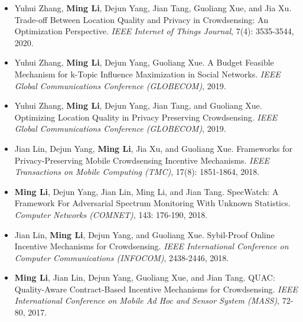  

\begin{itemize}[leftmargin=*]
	\item
	Yuhui Zhang, \textbf{Ming Li}, Dejun Yang, Jian Tang, Guoliang Xue, and Jia Xu. Trade-off Between Location Quality and Privacy in Crowdsensing: An Optimization Perspective. \textit{IEEE Internet of Things Journal}, 7(4): 3535-3544, 2020.
	
	\item
	Yuhui Zhang, \textbf{Ming Li}, Dejun Yang, Guoliang Xue.
	A Budget Feasible Mechanism for k-Topic Influence Maximization in Social Networks.
	\textit{IEEE Global Communications Conference (GLOBECOM)}, 2019.
	
	\item
	Yuhui Zhang, \textbf{Ming Li}, Dejun Yang, Jian Tang, and Guoliang Xue.
	Optimizing Location Quality in Privacy Preserving Crowdsensing.
	\textit{IEEE Global Communications Conference (GLOBECOM)}, 2019.
	
	\item 
	Jian Lin, Dejun Yang, \textbf{Ming Li}, Jia Xu, and Guoliang Xue. Frameworks for Privacy-Preserving Mobile Crowdsensing Incentive Mechanisms. \textit{IEEE Transactions on Mobile Computing (TMC)}, 17(8): 1851-1864, 2018.
	
	\item 
	\textbf{Ming Li}, Dejun Yang, Jian Lin, Ming Li, and Jian Tang. SpecWatch: A Framework For Adversarial Spectrum Monitoring With Unknown Statistics. \textit{Computer Networks (COMNET)}, 143: 176-190, 2018.
	
	\item 
	Jian Lin, \textbf{Ming Li}, Dejun Yang, and Guoliang Xue. Sybil-Proof Online Incentive Mechanisms for Crowdsensing. \textit{IEEE International Conference on Computer Communications (INFOCOM)}, 2438-2446, 2018.
	
	
	\item 
	\textbf{Ming Li}, Jian Lin, Dejun Yang, Guoliang Xue, and Jian Tang. QUAC: Quality-Aware Contract-Based Incentive Mechanisms for Crowdsensing. \textit{IEEE International Conference on Mobile Ad Hoc and Sensor System (MASS)}, 72-80, 2017.
	

\end{itemize}
